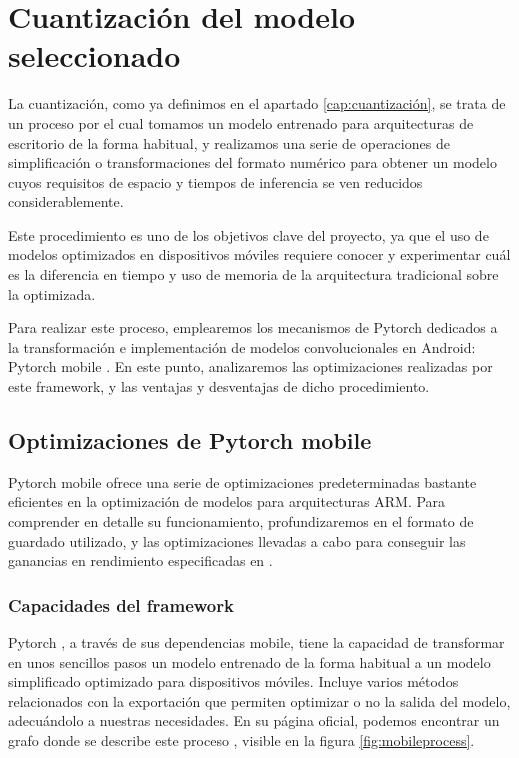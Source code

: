 \chapter{Cuantización del modelo seleccionado}
\label{sec:capt6}

La cuantización, como ya definimos en el apartado \ref{cap:cuantización}, se trata de un proceso por el cual tomamos un modelo entrenado para arquitecturas de escritorio de la forma habitual, y realizamos una serie de operaciones de simplificación o transformaciones del formato numérico para obtener un modelo cuyos requisitos de espacio y tiempos de inferencia se ven reducidos considerablemente. 

Este procedimiento es uno de los objetivos clave del proyecto, ya que el uso de modelos optimizados en dispositivos móviles requiere conocer y experimentar cuál es la diferencia en tiempo y uso de memoria de la arquitectura tradicional sobre la optimizada.

Para realizar este proceso, emplearemos los mecanismos de Pytorch\cite{paszke2019pytorch} dedicados a la transformación e implementación de modelos convolucionales en Android: Pytorch mobile  \cite{pmobile}. En este punto, analizaremos las optimizaciones realizadas por este framework, y las ventajas y desventajas de dicho procedimiento.

\section{Optimizaciones de Pytorch mobile}

Pytorch mobile ofrece una serie de optimizaciones predeterminadas bastante eficientes en la optimización de modelos para arquitecturas ARM. Para comprender en detalle su funcionamiento, profundizaremos en el formato de guardado utilizado, y las optimizaciones llevadas a cabo para conseguir las ganancias en rendimiento especificadas en \cite{pmobile}.

\subsection{Capacidades del framework}
Pytorch \cite{paszke2019pytorch}, a través de sus dependencias mobile, tiene la capacidad de transformar en unos sencillos pasos un modelo entrenado de la forma habitual a un modelo simplificado optimizado para dispositivos móviles. Incluye varios métodos relacionados con la exportación que permiten optimizar o no la salida del modelo, adecuándolo a nuestras necesidades. En su página oficial, podemos encontrar un grafo donde se describe este proceso \cite{pmobile}, visible en la figura \ref{fig:mobileprocess}.

